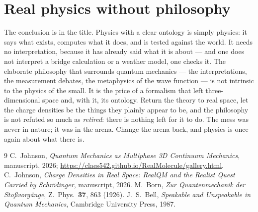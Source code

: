 \documentclass[11pt]{article}
\begin{document}
\section{Real physics without philosophy}

The conclusion is in the title. Physics with a clear ontology is simply physics: it says what exists, computes
what it does, and is tested against the world. It needs no interpretation, because it has already said what it
is about --- and one does not interpret a bridge calculation or a weather model, one checks it. The elaborate
philosophy that surrounds quantum mechanics --- the interpretations, the measurement debates, the metaphysics
of the wave function --- is not intrinsic to the physics of the small. It is the price of a formalism that
left three-dimensional space and, with it, its ontology. Return the theory to real space, let the charge
densities be the things they plainly appear to be, and the philosophy is not refuted so much as
\emph{retired}: there is nothing left for it to do. The mess was never in nature; it was in the arena. Change
the arena back, and physics is once again about what there is.

\begin{thebibliography}{9}
 C.~Johnson, \emph{Quantum Mechanics as Multiphase 3D Continuum Mechanics}, manuscript,
2026; \url{https://claes542.github.io/RealMolecule/gallery.html}.
 C.~Johnson, \emph{Charge Densities in Real Space: RealQM and the Realist Quest Carried by
Schr\"odinger}, manuscript, 2026.
 M.~Born, \emph{Zur Quantenmechanik der Sto\ss vorg\"ange}, Z.\ Phys.\ \textbf{37}, 863
(1926).
 J.~S.~Bell, \emph{Speakable and Unspeakable in Quantum Mechanics}, Cambridge University
Press, 1987.
\end{thebibliography}
\end{document}
